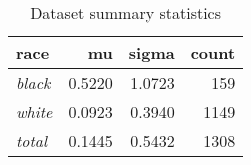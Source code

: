 \begin{table}[ht]

\caption{\label{tab:dataset_summary}Dataset summary statistics}
\centering
\begin{tabular}[t]{>{}lrrr}
\toprule
race & mu & sigma & count\\
\midrule
\em{black} & 0.5220 & 1.0723 & 159\\
\em{white} & 0.0923 & 0.3940 & 1149\\
\em{total} & 0.1445 & 0.5432 & 1308\\
\bottomrule
\end{tabular}
\end{table}
